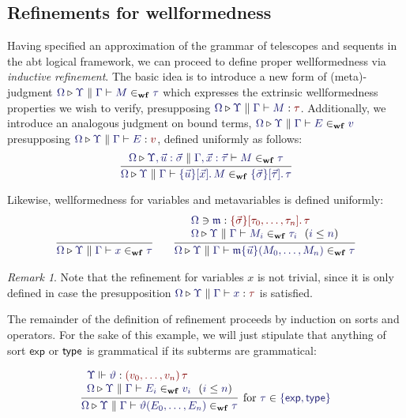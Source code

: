 \documentclass[11pt]{article}
\theoremstyle{definition}
\theoremstyle{remark}
\newtheorem{remark}[thm]{Remark}
\numberwithin{equation}{section}
\def\IModeColorName{MidnightBlue}
\def\OModeColorName{Maroon}
\newcommand\IMode[1]{{\color{\IModeColorName}{#1}}}
\newcommand\OMode[1]{{\color{\OModeColorName}{#1}}}
\newcommand\HypJ[2]{#1\ \ (#2)}
\newcommand\MkSet[1]{\left\{#1\right\}}
\newcommand\Member[2]{\IMode{#1}\in\IMode{#2}}
\newcommand\MkValence[3]{%
  \ifthenelse{\equal{#1}{}}{}{%
    \{#1\}%
  }%
  \ifthenelse{\equal{#2}{}}{}{%
    [#2]%
  }.\, #3%
}
\newcommand\MkBTm[3]{\{#1\}[#2].\, #3}
\newcommand\MkArity[2]{(#1)\, #2}
\newcommand\Leq[2]{\IMode{#1}\leq\IMode{#2}}
\newcommand\IsOperator[3]{\IMode{#1}\Vdash\IMode{#2}: \OMode{#3}}
\newcommand\Lookup[3]{\IMode{#1}\ni\IMode{#2}:\OMode{#3}}
\newcommand\IsAbt[5]{%
  \IMode{#1}\triangleright%
  \IMode{#2}\parallel%
  \IMode{#3}\vdash%
  \IMode{#4}:\OMode{#5}%
}
\newcommand\IsWf[5]{%
  \IMode{#1}\triangleright%
  \IMode{#2}\parallel%
  \IMode{#3}\vdash%
  \IMode{#4}\in_{\mathbf{wf}}\IMode{#5}%
}
\newcommand\MV[1]{\mathfrak{#1}}
\newcommand\MApp[3]{#1\{#2\}(#3)}
\newcommand\App[2]{#1(#2)}
\newcommand\SortExp{\mathsf{exp}}
\begin{document}
\subsection{Refinements for wellformedness}

Having specified an approximation of the grammar of telescopes and sequents in
the abt logical framework, we can proceed to define proper wellformedness via
\emph{inductive refinement}. The basic idea is to introduce a new form of
(meta)-judgment $\IsWf{\Omega}{\Upsilon}{\Gamma}{M}{\tau}$ which expresses the
extrinsic wellformedness properties we wish to verify, presupposing
$\IsAbt{\Omega}{\Upsilon}{\Gamma}{M}{\tau}$. Additionally, we introduce an
analogous judgment on bound terms, $\IsWf{\Omega}{\Upsilon}{\Gamma}{E}{v}$
presupposing $\IsAbt{\Omega}{\Upsilon}{\Gamma}{E}{v}$, defined uniformly as
follows:
\[
  \infer{
    \IsWf{\Omega}{\Upsilon}{\Gamma}{
      \MkBTm{\vec{u}}{\vec{x}}{M}
    }{
      \MkValence{\vec{\sigma}}{\vec{\tau}}{\tau}
    }
  }{
    \IsWf{\Omega}{\Upsilon,\vec{u}:\vec{\sigma}}{\Gamma,\vec{x}:\vec{\tau}}{M}{\tau}
  }
\]

Likewise, wellformedness for variables and metavariables is defined uniformly:
\begin{gather*}
  \infer{
    \IsWf{\Omega}{\Upsilon}{\Gamma}{x}{\tau}
  }{
  }\qquad
  \infer{
    \IsWf{\Omega}{\Upsilon}{\Gamma}{
      \MApp{\MV{m}}{\vec{u}}{M_0,\dots,M_n}
    }{\tau}
  }{
    \begin{array}{l}
      \Lookup{\Omega}{\MV{m}}{\MkValence{\vec{\sigma}}{\tau_0,\dots,\tau_n}{\tau}}\\
      \HypJ{
        \IsWf{\Omega}{\Upsilon}{\Gamma}{M_i}{\tau_i}
      }{
        \Leq{i}{n}
      }
    \end{array}
  }
\end{gather*}

\begin{remark}
  Note that the refinement for variables $x$ is not trivial, since it is only
  defined in case the presupposition $\IsAbt{\Omega}{\Upsilon}{\Gamma}{x}{\tau}$
  is satisfied.
\end{remark}

The remainder of the definition of refinement proceeds by induction on sorts
and operators. For the sake of this example, we will just stipulate that
anything of sort $\SortExp$ or $\mathsf{type}$ is grammatical if its subterms are
grammatical:

\[
  \infer[
    \text{for $\Member{\tau}{\MkSet{\SortExp,\SortType}}$}
  ]{
    \IsWf{\Omega}{\Upsilon}{\Gamma}{
      \App{\vartheta}{E_0,\dots,E_n}
    }{\tau}
  }{
    \begin{array}{l}
      \IsOperator{\Upsilon}{\vartheta}{
        \MkArity{
          v_0,\dots,v_n
        }{\tau}
      }\\
      \HypJ{
        \IsWf{\Omega}{\Upsilon}{\Gamma}{E_i}{v_i}
      }{
        \Leq{i}{n}
      }
    \end{array}
  }
\]
\end{document}
